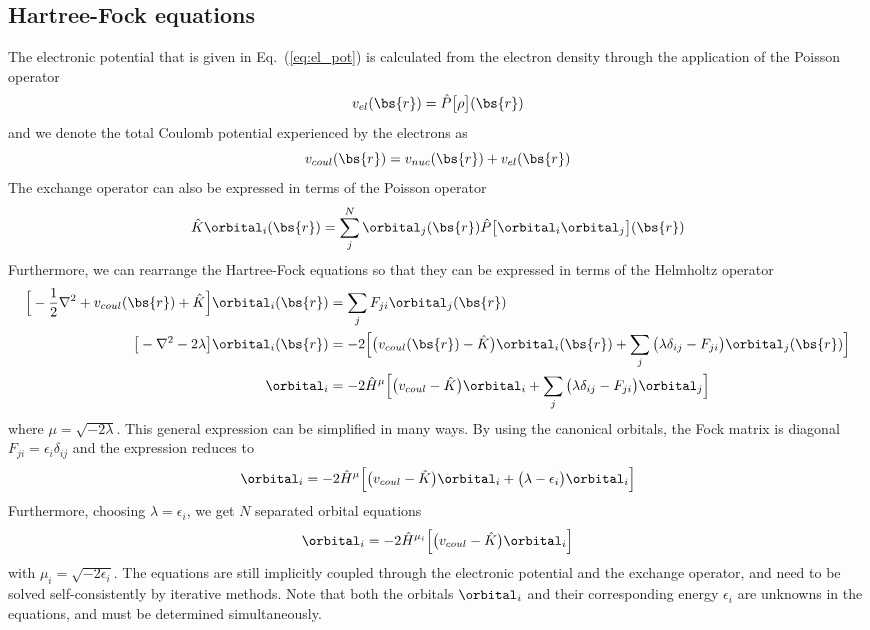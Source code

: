 \subsection{Hartree-Fock equations}
The electronic potential that is given in Eq.~(\ref{eq:el_pot}) is calculated from the electron 
density through the application of the Poisson operator
\begin{equation}
    v_{el}(\bs{r}) = \hat{P}\big[\rho\big](\bs{r})
\end{equation}
and we denote the total Coulomb potential experienced by the electrons as
\begin{equation}
    v_{coul}(\bs{r}) = v_{nuc}(\bs{r}) + v_{el}(\bs{r})
\end{equation}
The exchange operator can also be expressed in terms of the Poisson operator
\begin{equation}
    \hat{K}\orbital_i(\bs{r}) = \sum_j^N \orbital_j(\bs{r}) \hat{P}\big[\orbital_i\orbital_j\big](\bs{r})
\end{equation}
Furthermore, we can rearrange the Hartree-Fock equations so that they can be expressed in terms of the
Helmholtz operator
\begin{align}
    \Big[-\frac{1}{2}\nabla^2+v_{coul}(\bs{r})+\hat{K}\Big]\orbital_i(\bs{r}) 
	    &= \sum_j F_{ji} \orbital_j(\bs{r})\\
    \big[-\nabla^2 - 2\lambda\big]\orbital_i(\bs{r}) &= -2\Big[\big(v_{coul}(\bs{r})-\hat{K}\big) 
	    \orbital_i(\bs{r}) + \sum_j \big(\lambda\delta_{ij} - F_{ji}\big) \orbital_j(\bs{r})\Big]\\
    \orbital_i &= -2\hat{H}^\mu\Big[\big(v_{coul} - \hat{K}\big) \orbital_i + 
	\sum_j \big(\lambda\delta_{ij} - F_{ji}\big) \orbital_j\Big]
\end{align}
where $\mu = \sqrt{-2\lambda}$. This general expression can be simplified in many ways. By using the 
canonical orbitals, the Fock matrix is diagonal $F_{ji} = \epsilon_i\delta_{ij}$ and the expression 
reduces to
\begin{equation}
    \orbital_i = -2\hat{H}^\mu\Big[\big(v_{coul} - \hat{K}\big) \orbital_i + 
	\big(\lambda - \epsilon_{i}\big) \orbital_i\Big]
\end{equation}
Furthermore, choosing $\lambda = \epsilon_i$, we get $N$ separated orbital equations
\begin{equation}
    \orbital_i = -2 \hat{H}^{\mu_i}\Big[\big(v_{coul} - \hat{K}\big)\orbital_i\Big]
\end{equation}
with $\mu_i = \sqrt{-2\epsilon_i}$. The equations are still implicitly coupled through the electronic
potential and the exchange operator, and need to be solved self-consistently by iterative methods. Note 
that both the orbitals $\orbital_i$ and their corresponding energy $\epsilon_i$ are unknowns in the
equations, and must be determined simultaneously.

